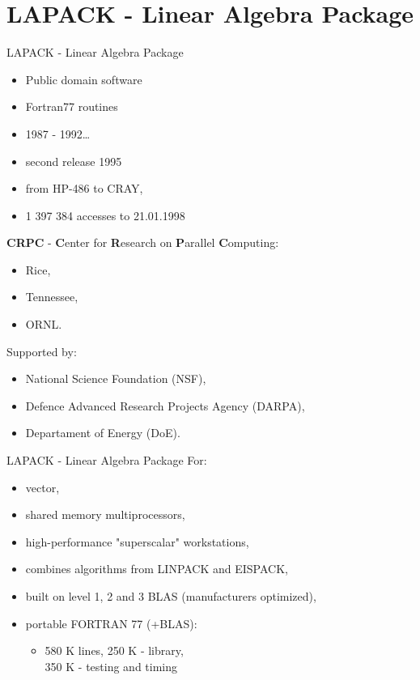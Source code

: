 \section{LAPACK - Linear Algebra Package}
	\begin{frame}{LAPACK - Linear Algebra Package}
		\begin{itemize}
			\item Public domain software
			\item Fortran77 routines
			\item 1987 - 1992\dots
			\item second release 1995
			\item from HP-486 to CRAY,
			\item 1 397 384 accesses to 21.01.1998
		\end{itemize}
		\textbf{CRPC} - \textbf{C}enter for \textbf{R}esearch on \textbf{P}arallel \textbf{C}omputing: 
		\begin{itemize}
			\item Rice,
			\item Tennessee,
			\item ORNL.
		\end{itemize}
		Supported by:
		\begin{itemize}
			\item National Science Foundation (NSF),
			\item Defence Advanced Research Projects Agency (DARPA),
			\item Departament of Energy (DoE).
		\end{itemize}
	\end{frame}
	\begin{frame}{LAPACK - Linear Algebra Package}
	For: \\ 
		\begin{itemize}
			\item vector,
			\item shared memory multiprocessors,
			\item high-performance "superscalar" workstations,
			\item combines algorithms from LINPACK and EISPACK,
			\item built on level 1, 2 and 3 BLAS (manufacturers optimized),
			\item portable FORTRAN 77 (+BLAS): 
			\begin{itemize}
				\item 580 K lines, 250 K - library, \\350 K - testing and timing
			\end{itemize}
		\end{itemize}
	\end{frame}
